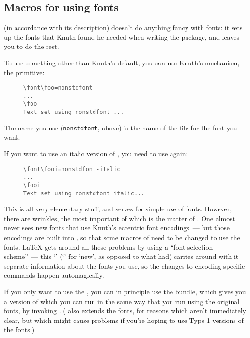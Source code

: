 \subsection{Macros for using fonts}


\plaintex{} (in accordance with its description) doesn't do anything
fancy with fonts: it sets up the fonts that Knuth found he needed when
writing the package, and leaves you to do the rest.

To use something other than Knuth's default, you can use Knuth's
mechanism, the  primitive:
\begin{quote}
\begin{verbatim}
\font\foo=nonstdfont
...
\foo
Text set using nonstdfont ...
\end{verbatim}
\end{quote}
The name you use (\texttt{nonstdfont}, above) is the name of the
 file for the font you want.

If you want to use an italic version of , you need to use
 again:
\begin{quote}
\begin{verbatim}
\font\fooi=nonstdfont-italic
...
\fooi
Text set using nonstdfont italic...
\end{verbatim}
\end{quote}
This is all very elementary stuff, and serves for simple use of fonts.
However, there are wrinkles, the most important of which is the matter
of .  One almost never sees new fonts
that use Knuth's eccentric font encodings~--- but those encodings are
built into \plaintex{}, so that some macros of \plaintex{} need to be
changed to use the fonts.  \LaTeX{} gets around all these problems by
using a ``font selection scheme''~--- this `' (`'
for `new', as opposed to what \LaTeXo{} had) carries around with it
separate information about the fonts you use, so the changes to
encoding-specific commands happen automagically.

If you only want to use the , you
can in principle use the  bundle, which gives you a version
of \plaintex{} which you can run in the same way that you run
\plaintex{} using the original  fonts, by invoking
.  ( also extends the  fonts,
for reasons which aren't immediately clear, but which might cause
problems if you're hoping to use Type 1 versions of the fonts.)

